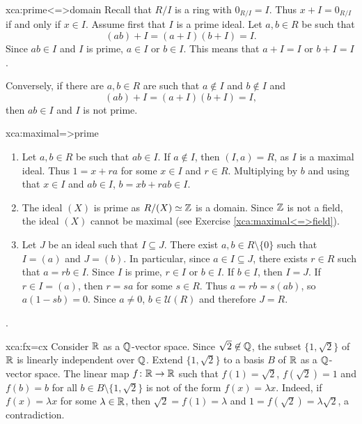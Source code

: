 \begin{sol}{xca:prime<=>domain}
    Recall that $R/I$ is a ring with 
    $0_{R/I}=I$. Thus $x+I=0_{R/I}$ if and only if $x\in I$. 
    Assume first that $I$ is a prime ideal. 
    Let $a,b\in R$ be such that 
    \[
    (ab)+I=(a+I)(b+I)=I.
    \]
    Since
    $ab\in I$ and $I$ is prime, $a\in I$ or $b\in I$. This means
    that $a+I=I$ or $b+I=I$. 
    
    Conversely, if there are $a,b\in R$ 
    are such that $a\not\in I$ and $b\not\in I$ and 
    \[
    (ab)+I=(a+I)(b+I)=I,
    \]
    then $ab\in I$ and $I$ is not prime. 
\end{sol}

\begin{sol}{xca:maximal=>prime}
\begin{enumerate}
    \item Let $a,b\in R$ be such that $ab\in I$. If $a\not\in I$, 
    then $(I,a)=R$, as $I$ is a maximal ideal. Thus $1=x+ra$ for
    some $x\in I$ and $r\in R$. Multiplying by $b$ and using
    that $x\in I$ and $ab\in I$,  
    $b=xb+rab\in I$. 
    \item The ideal $(X)$ is prime as $R/(X)\simeq\mathbb{Z}$ is a domain. Since     $\mathbb{Z}$ is not a field, the ideal $(X)$ cannot be maximal (see
        Exercise \ref{xca:maximal<=>field}). 
    \item Let $J$ be an ideal such that $I\subseteq J$. There 
        exist $a,b\in R\setminus\{0\}$
        such that $I=(a)$ and $J=(b)$. In particular, 
        since $a\in I\subseteq J$, there exists $r\in R$ such that
        $a=rb\in I$. Since $I$ is prime, $r\in I$ or $b\in I$. 
        If $b\in I$, then $I=J$. If $r\in I=(a)$, then 
        $r=sa$ for some $s\in R$. Thus  
        $a=rb=s(ab)$, so $a(1-sb)=0$. Since $a\ne 0$, 
        $b\in\mathcal{U}(R)$ and therefore $J=R$. 
\end{enumerate}
. 
\end{sol}

\begin{sol}{xca:fx=cx}
    Consider $\mathbb{R}$ as a $\mathbb{Q}$-vector space. 
    Since $\sqrt{2}\not\in\mathbb{Q}$, the subset $\{1,\sqrt{2}\}$ of $\mathbb{R}$ 
    is linearly independent 
    over $\mathbb{Q}$. Extend $\{1,\sqrt{2}\}$ 
    to a basis $B$ of $\mathbb{R}$ as a $\mathbb{Q}$-vector space. The
    linear map $f\colon\mathbb{R}\to\mathbb{R}$ such that
    $f(1)=\sqrt{2}$, $f(\sqrt{2})=1$ and $f(b)=b$ for all $b\in B\setminus\{1,\sqrt{2}\}$ 
    is not of the form $f(x)=\lambda x$. Indeed, if $f(x)=\lambda x$ for some $\lambda\in\mathbb{R}$, 
    then $\sqrt{2}=f(1)=\lambda$ and $1=f(\sqrt{2})=\lambda\sqrt{2}$, a contradiction. 
\end{sol}

